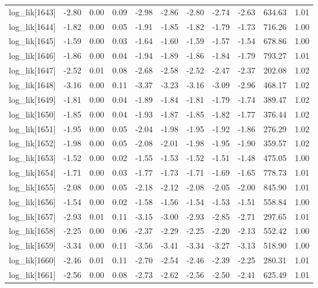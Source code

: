\begin{table}[ht]
\begin{tabular}{rrrrrrrrrrr}
  log\_lik[1643] & -2.80 & 0.00 & 0.09 & -2.98 & -2.86 & -2.80 & -2.74 & -2.63 & 634.63 & 1.01 \\ 
  log\_lik[1644] & -1.82 & 0.00 & 0.05 & -1.91 & -1.85 & -1.82 & -1.79 & -1.73 & 716.26 & 1.00 \\ 
  log\_lik[1645] & -1.59 & 0.00 & 0.03 & -1.64 & -1.60 & -1.59 & -1.57 & -1.54 & 678.86 & 1.00 \\ 
  log\_lik[1646] & -1.86 & 0.00 & 0.04 & -1.94 & -1.89 & -1.86 & -1.84 & -1.79 & 793.27 & 1.01 \\ 
  log\_lik[1647] & -2.52 & 0.01 & 0.08 & -2.68 & -2.58 & -2.52 & -2.47 & -2.37 & 202.08 & 1.02 \\ 
  log\_lik[1648] & -3.16 & 0.00 & 0.11 & -3.37 & -3.23 & -3.16 & -3.09 & -2.96 & 468.17 & 1.02 \\ 
  log\_lik[1649] & -1.81 & 0.00 & 0.04 & -1.89 & -1.84 & -1.81 & -1.79 & -1.74 & 389.47 & 1.02 \\ 
  log\_lik[1650] & -1.85 & 0.00 & 0.04 & -1.93 & -1.87 & -1.85 & -1.82 & -1.77 & 376.44 & 1.02 \\ 
  log\_lik[1651] & -1.95 & 0.00 & 0.05 & -2.04 & -1.98 & -1.95 & -1.92 & -1.86 & 276.29 & 1.02 \\ 
  log\_lik[1652] & -1.98 & 0.00 & 0.05 & -2.08 & -2.01 & -1.98 & -1.95 & -1.90 & 359.57 & 1.02 \\ 
  log\_lik[1653] & -1.52 & 0.00 & 0.02 & -1.55 & -1.53 & -1.52 & -1.51 & -1.48 & 475.05 & 1.00 \\ 
  log\_lik[1654] & -1.71 & 0.00 & 0.03 & -1.77 & -1.73 & -1.71 & -1.69 & -1.65 & 778.73 & 1.01 \\ 
  log\_lik[1655] & -2.08 & 0.00 & 0.05 & -2.18 & -2.12 & -2.08 & -2.05 & -2.00 & 845.90 & 1.01 \\ 
  log\_lik[1656] & -1.54 & 0.00 & 0.02 & -1.58 & -1.56 & -1.54 & -1.53 & -1.51 & 558.84 & 1.00 \\ 
  log\_lik[1657] & -2.93 & 0.01 & 0.11 & -3.15 & -3.00 & -2.93 & -2.85 & -2.71 & 297.65 & 1.01 \\ 
  log\_lik[1658] & -2.25 & 0.00 & 0.06 & -2.37 & -2.29 & -2.25 & -2.20 & -2.13 & 552.42 & 1.00 \\ 
  log\_lik[1659] & -3.34 & 0.00 & 0.11 & -3.56 & -3.41 & -3.34 & -3.27 & -3.13 & 518.90 & 1.00 \\ 
  log\_lik[1660] & -2.46 & 0.01 & 0.11 & -2.70 & -2.54 & -2.46 & -2.39 & -2.25 & 280.31 & 1.01 \\ 
  log\_lik[1661] & -2.56 & 0.00 & 0.08 & -2.73 & -2.62 & -2.56 & -2.50 & -2.41 & 625.49 & 1.01 \\ 

\end{tabular}
\end{table}
